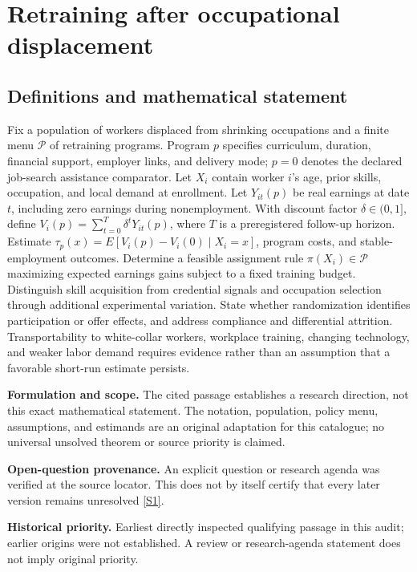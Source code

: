 \documentclass[11pt]{article}
\newcommand{\sref}[2]{\hyperlink{source:#1:#2}{[S#2]}}
\begin{document}
\section*{Retraining after occupational displacement}\label{30007635}
\subsection{Definitions and mathematical statement}
Fix a population of workers displaced from shrinking occupations and a finite menu \(\mathcal P\) of retraining programs. Program \(p\) specifies curriculum, duration, financial support, employer links, and delivery mode; \(p=0\) denotes the declared job-search assistance comparator. Let \(X_i\) contain worker \(i\)'s age, prior skills, occupation, and local demand at enrollment. Let \(Y_{it}(p)\) be real earnings at date \(t\), including zero earnings during nonemployment. With discount factor \(\delta\in(0,1]\), define \(V_i(p)=\sum_{t=0}^{T}\delta^tY_{it}(p)\), where \(T\) is a preregistered follow-up horizon. Estimate \(\tau_p(x)=E[V_i(p)-V_i(0)\mid X_i=x]\), program costs, and stable-employment outcomes. Determine a feasible assignment rule \(\pi(X_i)\in\mathcal P\) maximizing expected earnings gains subject to a fixed training budget. Distinguish skill acquisition from credential signals and occupation selection through additional experimental variation. State whether randomization identifies participation or offer effects, and address compliance and differential attrition. Transportability to white-collar workers, workplace training, changing technology, and weaker labor demand requires evidence rather than an assumption that a favorable short-run estimate persists.

\par\textbf{Formulation and scope.} The cited passage establishes a research direction, not this exact mathematical statement. The notation, population, policy menu, assumptions, and estimands are an original adaptation for this catalogue; no universal unsolved theorem or source priority is claimed.

\par\textbf{Open-question provenance.} An explicit question or research agenda was verified at the source locator. This does not by itself certify that every later version remains unresolved \sref{30007635}{1}.

\par\textbf{Historical priority.} Earliest directly inspected qualifying passage in this audit; earlier origins were not established. A review or research-agenda statement does not imply original priority.
\end{document}
